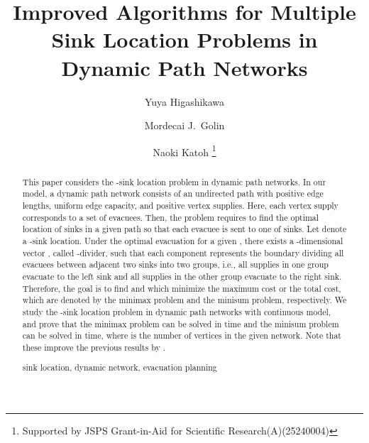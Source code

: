 \documentclass[a4paper]{llncs}
\newcommand{\keywords}[1]{\par\addvspace\baselineskip
\noindent\keywordname\enspace\ignorespaces#1}
\begin{document}
\mainmatter

\title{Improved Algorithms for Multiple Sink Location Problems in Dynamic Path Networks}

\author{
Yuya Higashikawa 
\and Mordecai J.~Golin 
\and Naoki Katoh  \thanks{Supported by JSPS Grant-in-Aid for Scientific Research(A)(25240004)}
}



\maketitle


\begin{abstract}
This paper considers the -sink location problem in dynamic path networks.
In our model, a dynamic path network consists of an undirected path with positive edge lengths, uniform edge capacity, and positive vertex supplies.
Here, each vertex supply corresponds to a set of evacuees.
Then, the problem requires to find the optimal location of  sinks in a given path so that each evacuee is sent to one of  sinks.
Let  denote a -sink location.
Under the optimal evacuation for a given , 
there exists a -dimensional vector , called -divider, 
such that each component represents the boundary dividing all evacuees between adjacent two sinks into two groups, 
i.e., all supplies in one group evacuate to the left sink and all supplies in the other group evacuate to the right sink.
Therefore, the goal is to find  and  which minimize the maximum cost or the total cost,
which are denoted by the minimax problem and the minisum problem, respectively.
We study the -sink location problem in dynamic path networks with continuous model,
and prove that the minimax problem can be solved in  time and the minisum problem can be solved in  time,
where  is the number of vertices in the given network.
Note that these improve the previous results by \cite{hgk14_2}.
\keywords{sink location, dynamic network, evacuation planning}
\end{abstract}
\end{document}
